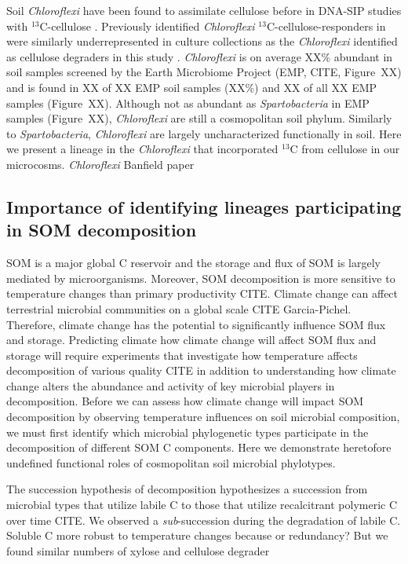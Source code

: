 Soil \textit{Chloroflexi} have been found to assimilate cellulose before in
DNA-SIP studies with $^{13}$C-cellulose \citep{Schellenberger_2010}. Previously
identified \textit{Chloroflexi} $^{13}$C-cellulose-responders in were similarly
underrepresented in culture collections as the \textit{Chloroflexi} identified
as cellulose degraders in this study \citep{Schellenberger_2010}.
\textit{Chloroflexi} is on average XX\% abundant in soil samples screened by
the Earth Microbiome Project (EMP, CITE, Figure~XX) and is found in XX of XX
EMP soil samples (XX\%) and XX of all XX EMP samples (Figure~XX). Although not
as abundant as \textit{Spartobacteria} in EMP samples (Figure~XX),
\textit{Chloroflexi} are still a cosmopolitan soil phylum. Similarly to
\textit{Spartobacteria}, \textit{Chloroflexi} are largely uncharacterized
functionally in soil. Here we present a lineage in the \textit{Chloroflexi}
that incorporated $^{13}$C from cellulose in our microcosms.
\textit{Chloroflexi} Banfield paper

\subsection{Importance of identifying lineages participating in SOM decomposition}
\label{sub:succession_with_degradation_of_labile_c}
SOM is a major global C reservoir and the storage and flux of SOM is largely
mediated by microorganisms. Moreover, SOM decomposition is more sensitive to
temperature changes than primary productivity CITE. Climate change can affect
terrestrial microbial communities on a global scale CITE Garcia-Pichel. Therefore,
climate change has the potential to significantly influence SOM flux and 
storage. Predicting climate how climate change will affect SOM flux and storage
will require experiments that investigate how temperature affects decomposition
of various quality CITE in addition to understanding how climate change alters
the abundance and activity of key microbial players in decomposition. Before
we can assess how climate change will impact SOM decomposition by observing
temperature influences on soil microbial composition, we must first identify
which microbial phylogenetic types participate in the decomposition of
different SOM C components. Here we demonstrate heretofore undefined functional
roles of cosmopolitan soil microbial phylotypes. 

The succession hypothesis of decomposition hypothesizes a succession from
microbial types that utilize labile C to those that utilize recalcitrant
polymeric C over time CITE. We observed a \textit{sub}-succession during the
degradation of labile C. Soluble C more robust to temperature changes because
or redundancy? But we found similar numbers of xylose and cellulose 
degrader

